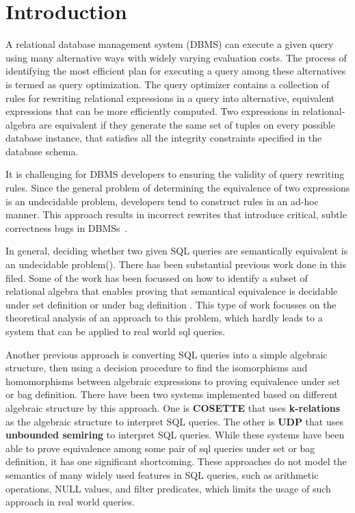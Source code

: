 \section{Introduction}\label{sec:introduction}

A relational database management system (DBMS) can execute a given query using
many alternative ways with widely varying evaluation costs. 
The process of identifying the most efficient plan for executing a query among
these alternatives is termed as query optimization. 
The query optimizer contains a collection of rules for rewriting relational
expressions in a query into alternative, equivalent expressions that can be more
efficiently computed. Two expressions in relational-algebra are equivalent 
if they generate the same set of tuples on every possible database instance,
that satisfies all the integrity constraints specified in the database schema.
 
It is challenging for DBMS developers to ensuring the validity of query
rewriting rules. Since the general problem of determining the equivalence of two
expressions is an undecidable problem, developers tend to construct rules
in an ad-hoc manner. This approach results in incorrect rewrites that introduce
critical, subtle correctness bugs in DBMSs~\cite{ganski87}.

In general, deciding whether two given SQL queries are semantically equivalent
is an undecidable problem().
There has been substantial previous work done in this filed.
Some of the work has been focussed on how to identify a subset of relational
algebra that enables proving that semantical equivalence is decidable under set
definition  or under bag definition .
This type of work focusses on the theoretical analysis of an approach to this
problem, which hardly leads to a system that can be applied to real world sql
queries.

Another previous approach is converting SQL queries into a simple algebraic
structure, then using a decision procedure to find the isomorphisms and
homomorphisms between algebraic expressions to proving equivalence under set or
bag definition.
There have been two systems implemented based on different algebraic structure
by this approach.
One is \textbf{COSETTE}  that uses \textbf{k-relations} as the
algebraic structure to interpret SQL queries.
The other is \textbf{UDP}  that uses \textbf{unbounded semiring} to
interpret SQL queries.
While these systems have been able to prove equivalence among some pair of sql
queries under set or bag definition, it has one significant shortcoming.
These approaches do not model the semantics of many widely used features in SQL
queries, such as arithmetic operations, NULL values, and filter predicates,
which limits the usage of such approach in real world queries.

